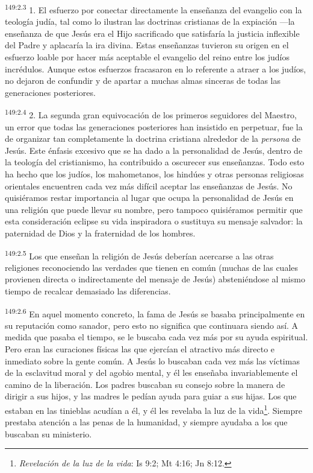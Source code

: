 \par
\textsuperscript{149:2.3} 1. El esfuerzo por conectar directamente la enseñanza del evangelio con la teología judía, tal como lo ilustran las doctrinas cristianas de la expiación ---la enseñanza de que Jesús era el Hijo sacrificado que satisfaría la justicia inflexible del Padre y aplacaría la ira divina. Estas enseñanzas tuvieron su origen en el esfuerzo loable por hacer más aceptable el evangelio del reino entre los judíos incrédulos. Aunque estos esfuerzos fracasaron en lo referente a atraer a los judíos, no dejaron de confundir y de apartar a muchas almas sinceras de todas las generaciones posteriores.

\par
\textsuperscript{149:2.4} 2. La segunda gran equivocación de los primeros seguidores del Maestro, un error que todas las generaciones posteriores han insistido en perpetuar, fue la de organizar tan completamente la doctrina cristiana alrededor de la \textit{persona} de Jesús. Este énfasis excesivo que se ha dado a la personalidad de Jesús, dentro de la teología del cristianismo, ha contribuido a oscurecer sus enseñanzas. Todo esto ha hecho que los judíos, los mahometanos, los hindúes y otras personas religiosas orientales encuentren cada vez más difícil aceptar las enseñanzas de Jesús. No quisiéramos restar importancia al lugar que ocupa la personalidad de Jesús en una religión que puede llevar su nombre, pero tampoco quisiéramos permitir que esta consideración eclipse su vida inspiradora o sustituya su mensaje salvador: la paternidad de Dios y la fraternidad de los hombres.

\par
\textsuperscript{149:2.5} Los que enseñan la religión de Jesús deberían acercarse a las otras religiones reconociendo las verdades que tienen en común (muchas de las cuales provienen directa o indirectamente del mensaje de Jesús) absteniéndose al mismo tiempo de recalcar demasiado las diferencias.

\par
\textsuperscript{149:2.6} En aquel momento concreto, la fama de Jesús se basaba principalmente en su reputación como sanador, pero esto no significa que continuara siendo así. A medida que pasaba el tiempo, se le buscaba cada vez más por su ayuda espiritual. Pero eran las curaciones físicas las que ejercían el atractivo más directo e inmediato sobre la gente común. A Jesús lo buscaban cada vez más las víctimas de la esclavitud moral y del agobio mental, y él les enseñaba invariablemente el camino de la liberación. Los padres buscaban su consejo sobre la manera de dirigir a sus hijos, y las madres le pedían ayuda para guiar a sus hijas. Los que estaban en las tinieblas acudían a él, y él les revelaba la luz de la vida\footnote{\textit{Revelación de la luz de la vida}: Is 9:2; Mt 4:16; Jn 8:12.}. Siempre prestaba atención a las penas de la humanidad, y siempre ayudaba a los que buscaban su ministerio.

